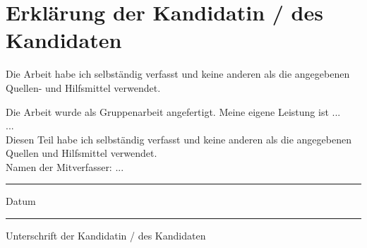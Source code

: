 \chapter{Erklärung der Kandidatin / des Kandidaten}

\begin{description}[$\Box$~]
	\item[$\Box$] Die Arbeit habe ich selbständig verfasst und keine anderen als die angegebenen Quellen- und Hilfsmittel verwendet.\\

	\item[$\Box$] Die Arbeit wurde als Gruppenarbeit angefertigt. Meine eigene Leistung ist ... \\
	...\\

	Diesen Teil habe ich selbständig verfasst und keine anderen als die angegebenen Quellen und Hilfsmittel verwendet. \\

	Namen der Mitverfasser: ...

\end{description}

\vspace{2cm}

\begin{minipage}[t]{3cm}
	\rule{3cm}{0.5pt}
	Datum
\end{minipage}
\hfill
\begin{minipage}[t]{9cm}
	\rule{9cm}{0.5pt}
	Unterschrift der Kandidatin / des Kandidaten
\end{minipage}
